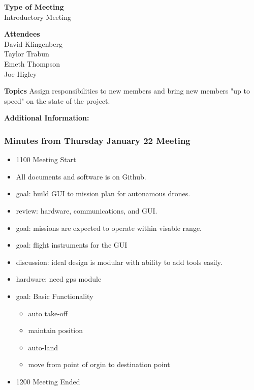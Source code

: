 \documentclass[pdftex,11pt]{article}
\begin{document}
{ \large \bfseries \hspace*{2 mm} Type of Meeting\\}
\hspace*{12 mm}  Introductory Meeting
\vspace*{1.5mm}

{ \large \bfseries \hspace*{2 mm} Attendees\\}
\hspace*{12mm} David Klingenberg\\
\hspace*{12mm} Taylor Trabun\\
\hspace*{12mm} Emeth Thompson\\
\hspace*{12mm} Joe Higley\\
\vspace*{1.5mm}

{ \large \bfseries \noindent Topics}
\hspace*{12mm} Assign responsibilities to new members and bring new members "up to speed" on the state of the project.
\vspace*{2.5mm}

\vspace*{2.5mm}
{ \large \bfseries \noindent Additional Information:}


\subsubsection[short]{Minutes from Thursday January 22 Meeting}
\begin{itemize}
	\item 1100 \indent Meeting Start
	\item All documents and software is on Github.
	\item goal: build GUI to mission plan for autonamous drones.
	\item review: hardware, communications, and GUI.
	\item goal: missions are expected to operate within visable range.
	\item goal: flight instruments for the GUI
	\item discussion: ideal design is modular with ability to add tools easily.
	\item hardware: need gps module
	\item goal: Basic Functionality
	\begin{itemize}
		\item auto take-off
		\item maintain position
		\item auto-land
		\item move from point of orgin to destination point
	\end{itemize}
	\item 1200 \indent Meeting Ended
\end{itemize}	
\end{document}
